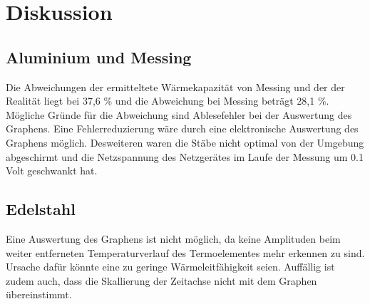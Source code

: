\section{Diskussion}
\label{sec:Diskussion}
\subsection{Aluminium und Messing}
Die Abweichungen der ermitteltete Wärmekapazität von Messing und der der Realität liegt bei 37,6 \% und die Abweichung bei Messing beträgt 28,1 \%. Mögliche Gründe für die Abweichung sind Ablesefehler bei der Auswertung des Graphens. Eine Fehlerreduzierung wäre durch eine elektronische Auswertung des Graphens möglich. Desweiteren waren die Stäbe nicht optimal von der Umgebung abgeschirmt und die Netzspannung des Netzgerätes im Laufe der Messung um 0.1 Volt geschwankt hat.

\subsection{Edelstahl}
Eine Auswertung des Graphens ist nicht möglich, da keine Amplituden beim weiter entferneten Temperaturverlauf des Termoelementes mehr erkennen zu sind. Ursache dafür könnte eine zu geringe Wärmeleitfähigkeit seien. Auffällig ist zudem auch, dass die Skallierung der Zeitachse nicht mit dem Graphen übereinstimmt.
